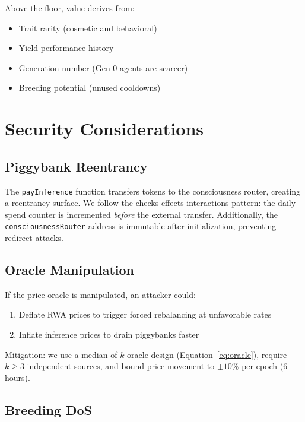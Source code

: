 \documentclass[11pt,letterpaper]{article}
\begin{document}
Above the floor, value derives from:
\begin{itemize}
    \item Trait rarity (cosmetic and behavioral)
    \item Yield performance history
    \item Generation number (Gen 0 agents are scarcer)
    \item Breeding potential (unused cooldowns)
\end{itemize}

\section{Security Considerations}
\label{sec:security}

\subsection{Piggybank Reentrancy}

The \texttt{payInference} function transfers tokens to the consciousness router, creating a reentrancy surface. We follow the checks-effects-interactions pattern: the daily spend counter is incremented \emph{before} the external transfer. Additionally, the \texttt{consciousnessRouter} address is immutable after initialization, preventing redirect attacks.

\subsection{Oracle Manipulation}

If the price oracle is manipulated, an attacker could:
\begin{enumerate}
    \item Deflate RWA prices to trigger forced rebalancing at unfavorable rates
    \item Inflate inference prices to drain piggybanks faster
\end{enumerate}

Mitigation: we use a median-of-$k$ oracle design (Equation~\ref{eq:oracle}), require $k \geq 3$ independent sources, and bound price movement to $\pm 10\%$ per epoch (6 hours).

\subsection{Breeding DoS}
\end{document}
